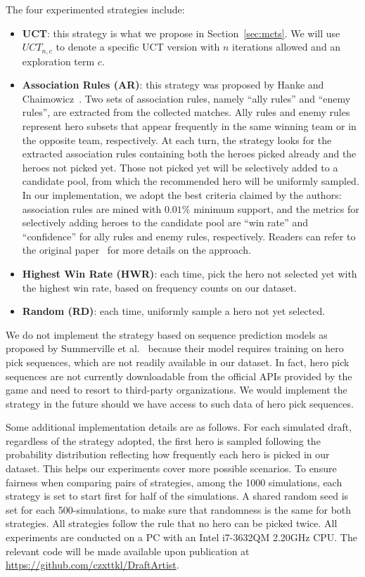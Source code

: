 The four experimented strategies include:
\begin{itemize}
\item \textbf{UCT}: this strategy is what we propose in Section~\ref{sec:mcts}. We will use $UCT_{n,c}$ to denote a specific UCT version with $n$ iterations allowed and an exploration term $c$. 
\item \textbf{Association Rules (AR)}: this strategy was proposed by Hanke and Chaimowicz~\cite{hanke2017reco}. Two sets of association rules, namely ``ally rules'' and ``enemy rules'', are extracted from the collected matches. Ally rules and enemy rules represent hero subsets that appear frequently in the same winning team or in the opposite team, respectively. At each turn, the strategy looks for the extracted association rules containing both the heroes picked already and the heroes not picked yet. Those not picked yet will be selectively added to a candidate pool, from which the recommended hero will be uniformly sampled. In our implementation, we adopt the best criteria claimed by the authors: association rules are mined with $0.01\%$ minimum support, and the metrics for selectively adding heroes to the candidate pool are ``win rate'' and ``confidence'' for ally rules and enemy rules, respectively. Readers can refer to the original paper~\cite{hanke2017reco} for more details on the approach. 
\item \textbf{Highest Win Rate (HWR)}: each time, pick the hero not selected yet with the highest win rate, based on frequency counts on our dataset. 
\item \textbf{Random (RD)}: each time, uniformly sample a hero not yet selected. 
\end{itemize}

We do not implement the strategy based on sequence prediction models as proposed by Summerville et al.~\cite{summerville2017reco} because their model requires training on hero pick sequences, which are not readily available in our dataset. In fact, hero pick sequences are not currently downloadable from the official APIs provided by the game and need to resort to third-party organizations. We would implement the strategy in the future should we have access to such data of hero pick sequences.

Some additional implementation details are as follows. For each simulated draft, regardless of the strategy adopted, the first hero is sampled following the probability distribution reflecting how frequently each hero is picked in our dataset. This helps our experiments cover more possible scenarios. To ensure fairness when comparing pairs of strategies, among the 1000 simulations, each strategy is set to start first for half of the simulations. A shared random seed is set for each 500-simulations, to make sure that randomness is the same for both strategies. All strategies follow the rule that no hero can be picked twice. All experiments are conducted on a PC with an Intel i7-3632QM 2.20GHz CPU. The relevant code will be made available upon publication at \url{https://github.com/czxttkl/DraftArtist}.

